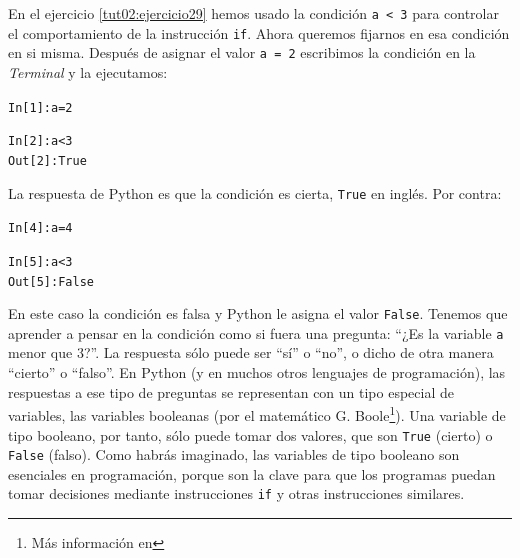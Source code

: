 \documentclass[10pt,a4paper]{article}\usepackage[]{graphicx}\usepackage[]{color}
\makeatletter
\newcommand{\hlnum}[1]{\textcolor[rgb]{0.686,0.059,0.569}{#1}}%
\newcommand{\hlopt}[1]{\textcolor[rgb]{0,0,0}{#1}}%
\newcommand{\hlstd}[1]{\textcolor[rgb]{0.345,0.345,0.345}{#1}}%
\newcommand{\hlkwb}[1]{\textcolor[rgb]{0.69,0.353,0.396}{#1}}%
\newenvironment{kframe}{%
 \def\at@end@of@kframe{}%
 \ifinner\ifhmode%
  \def\at@end@of@kframe{\end{minipage}}%
  \begin{minipage}{\columnwidth}%
 \fi\fi%
 \def\FrameCommand##1{\hskip\@totalleftmargin \hskip-\fboxsep
 \colorbox{shadecolor}{##1}\hskip-\fboxsep
     \hskip-\linewidth \hskip-\@totalleftmargin \hskip\columnwidth}%
 \MakeFramed {\advance\hsize-\width
   \@totalleftmargin\z@ \linewidth\hsize
   \@setminipage}}%
 {\par\unskip\endMakeFramed%
 \at@end@of@kframe}
\newenvironment{knitrout}{}{} %
\newcounter {cont01}
\makeatother
\begin{document}
En el ejercicio \ref{tut02:ejercicio29} hemos usado la condición {\tt a < 3}  para controlar el comportamiento de la instrucción {\tt if}. Ahora queremos fijarnos en esa condición en si misma. Después de asignar el valor {\tt a = 2} escribimos la condición en la {\em Terminal} y la ejecutamos:
\begin{knitrout}
\color{fgcolor}\begin{kframe}
\begin{alltt}
\hlstd{In [}\hlnum{1}\hlstd{]}\hlopt{:} \hlstd{a} \hlkwb{=} \hlnum{2}

\hlstd{In [}\hlnum{2}\hlstd{]}\hlopt{:} \hlstd{a} \hlopt{<} \hlnum{3}
\hlstd{Out[}\hlnum{2}\hlstd{]}\hlopt{:} \hlstd{True}
\end{alltt}
\end{kframe}
\end{knitrout}
La respuesta de Python es que la condición es cierta, {\tt True} en inglés. Por contra:
\begin{knitrout}
\color{fgcolor}\begin{kframe}
\begin{alltt}
\hlstd{In [}\hlnum{4}\hlstd{]}\hlopt{:} \hlstd{a} \hlkwb{=} \hlnum{4}

\hlstd{In [}\hlnum{5}\hlstd{]}\hlopt{:} \hlstd{a} \hlopt{<} \hlnum{3}
\hlstd{Out[}\hlnum{5}\hlstd{]}\hlopt{:} \hlstd{False}
\end{alltt}
\end{kframe}
\end{knitrout}
En este caso la condición es falsa y Python le asigna el valor {\tt False}. Tenemos que aprender a pensar en la condición como si fuera una pregunta: ``¿Es la variable {\tt a} menor que $3$?''. La respuesta sólo puede ser ``sí'' o ``no'', o dicho de otra manera ``cierto'' o ``falso''. En Python (y en muchos otros lenguajes de programación), las respuestas a ese tipo de preguntas se representan con un tipo especial de variables, las {\sf variables  booleanas} (por el matemático G. Boole\footnote{Más información en  }). Una variable de tipo booleano, por tanto, sólo puede tomar dos valores, que son {\tt True} (cierto) o {\tt False} (falso). Como habrás imaginado, las variables de tipo booleano son esenciales en programación, porque son la clave para que los programas puedan tomar  decisiones mediante instrucciones {\tt if} y otras instrucciones similares.
\end{document}
